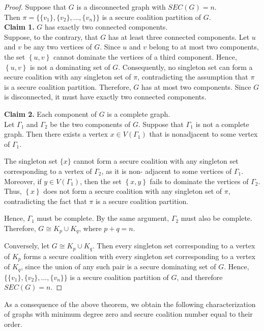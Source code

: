 \documentclass[12pt]{article}
\begin{document}
\begin{proof}
Suppose that $G$ is a disconnected graph with $SEC(G)=n$.\\ Then
$\pi=\bigl\{\{v_1\},\{v_2\},\ldots,\{v_n\}\bigr\}$
is a secure coalition partition of $G$.\\[2mm]
\textbf{Claim 1.} $G$ has exactly two connected components.\\
Suppose, to the contrary, that $G$ has at least three connected components. Let $u$ and $v$ be any two vertices of $G$. Since $u$ and $v$ belong to at most two components, the set $\left\{u,v\right\}$ cannot dominate the vertices of a third component. Hence, $\left\{u,v\right\}$ is not a dominating set of $G$. Consequently, no singleton set can form a secure coalition with any singleton set of $\pi$, contradicting the assumption that $\pi$ is a secure coalition partition. Therefore, $G$ has at most two components. Since $G$ is disconnected, it must have exactly two connected components.

\medskip

\textbf{Claim 2.} Each component of $G$ is a complete graph.\\
Let $\Gamma_1$ and $\Gamma_2$ be the two components of $G$. Suppose that $\Gamma_1$ is not a complete graph. Then there exists a vertex $x\in V(\Gamma_1)$ that is nonadjacent to some vertex of $\Gamma_1$.

 The singleton set $\{x\}$ cannot form a secure coalition with any singleton set corresponding to a vertex of $\Gamma_2$, as it is non- adjacent to some vertices of $\Gamma_1$. Moreover, if $y\in V(\Gamma_1)$, then the set $\left\{x,y\right\}$ fails to dominate the vertices of $\Gamma_2$. Thus, $\left\{x\right\}$ does not form a secure coalition with any singleton set of $\pi$, contradicting the fact that $\pi$ is a secure coalition partition.

Hence, $\Gamma_1$ must be complete. By the same argument, $\Gamma_2$ must also be complete. Therefore, $G\cong K_p\cup K_q$, where $p+q=n$.

Conversely, let $G\cong K_p\cup K_q$. Then every singleton set corresponding to a vertex of $K_p$ forms a secure coalition with every singleton set corresponding to a vertex of $K_q$, since the union of any such pair is a secure dominating set of $G$. Hence,
$\bigl\{\{v_1\},\{v_2\},\ldots,\{v_n\}\bigr\}$
is a secure coalition partition of $G$, and therefore $SEC(G)=n$.
\end{proof}

As a consequence of the above theorem, we obtain the following characterization of graphs with minimum degree zero and secure coalition number equal to their order.
\end{document}
